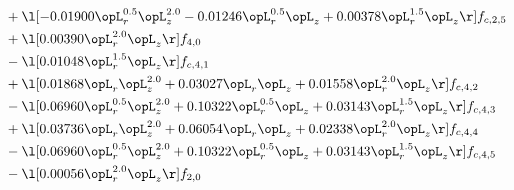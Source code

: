 \begin{alignat}{2}
& + \l[  -0.01900 \opL_r^{0.5} \opL_z^{2.0}   -0.01246 \opL_r^{0.5} \opL_z +  0.00378 \opL_r^{1.5} \opL_z  \r] f_{c,2,5} \nonumber \\ 
& + \l[  0.00390 \opL_r^{2.0} \opL_z  \r] f_{4,0} \nonumber \\ 
& - \l[  0.01048 \opL_r^{1.5} \opL_z  \r] f_{c,4,1} \nonumber \\ 
& + \l[  0.01868 \opL_r \opL_z^{2.0} +  0.03027 \opL_r \opL_z +  0.01558 \opL_r^{2.0} \opL_z  \r] f_{c,4,2} \nonumber \\ 
& - \l[  0.06960 \opL_r^{0.5} \opL_z^{2.0} +  0.10322 \opL_r^{0.5} \opL_z +  0.03143 \opL_r^{1.5} \opL_z  \r] f_{c,4,3} \nonumber \\ 
& + \l[  0.03736 \opL_r \opL_z^{2.0} +  0.06054 \opL_r \opL_z +  0.02338 \opL_r^{2.0} \opL_z  \r] f_{c,4,4} \nonumber \\ 
& - \l[  0.06960 \opL_r^{0.5} \opL_z^{2.0} +  0.10322 \opL_r^{0.5} \opL_z +  0.03143 \opL_r^{1.5} \opL_z  \r] f_{c,4,5} \nonumber \\ 
& - \l[  0.00056 \opL_r^{2.0} \opL_z  \r] f_{2,0} \nonumber \\ 
\end{alignat} 


